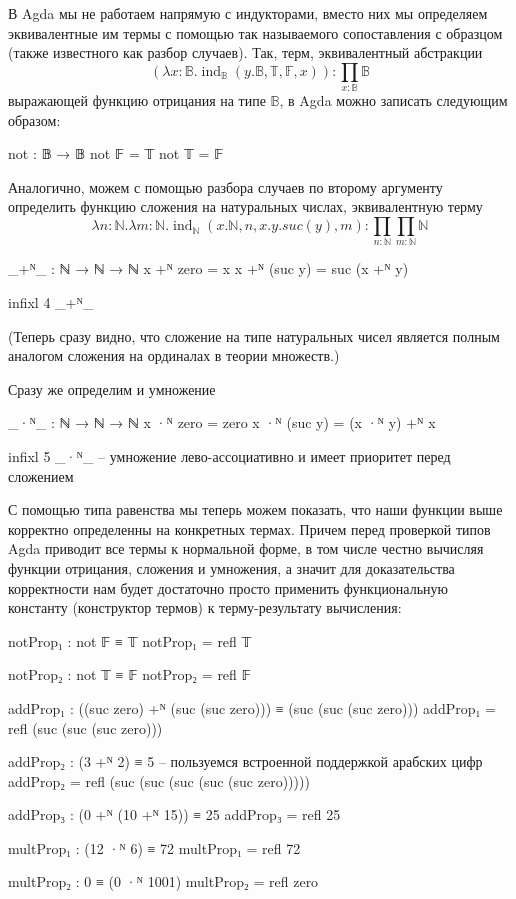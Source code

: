 \documentclass{article}[12pt]
\newcommand{\ind}{\operatorname{ind}}
\begin{document}
В Agda мы не работаем напрямую с индукторами, вместо них мы определяем эквивалентные им
термы с помощью так называемого сопоставления с образцом (также известного как разбор случаев). 
Так, терм, эквивалентный абстракции
$$(\lambda x : \mathbb B . \ind_{\mathbb B}(y.\mathbb B, \mathbb T, \mathbb F, x)) : \prod \limits_{x : \mathbb B} \mathbb B$$
выражающей функцию отрицания на типе $\mathbb B$, в Agda можно записать следующим образом:
\begin{code}
not : 𝔹 → 𝔹
not 𝔽 = 𝕋
not 𝕋 = 𝔽
\end{code}
Аналогично, можем с помощью разбора случаев по второму аргументу определить функцию сложения на натуральных числах, эквивалентную
терму
$$\lambda n : \mathbb N . \lambda m : \mathbb N . \ind_{\mathbb N}(x.\mathbb N, n, x.y.suc(y), m) : \prod_{n : \mathbb N} \prod_{m : \mathbb N} \mathbb N$$
\begin{code}
_+ᴺ_ : ℕ → ℕ → ℕ
x +ᴺ zero = x
x +ᴺ (suc y) = suc (x +ᴺ y)

infixl 4 _+ᴺ_
\end{code}
(Теперь сразу видно, что сложение на типе натуральных чисел является полным аналогом сложения
на ординалах в теории множеств.)

Сразу же определим и умножение
\begin{code}
_·ᴺ_ : ℕ → ℕ → ℕ
x ·ᴺ zero = zero
x ·ᴺ (suc y) = (x ·ᴺ y) +ᴺ x

infixl 5 _·ᴺ_ -- умножение лево-ассоциативно и имеет приоритет перед сложением
\end{code}

С помощью типа равенства  мы теперь можем показать, что наши функции выше
корректно определенны на конкретных термах. Причем перед проверкой типов Agda приводит все термы к нормальной
форме, в том числе честно вычисляя функции отрицания, сложения и умножения, а значит
для доказательства корректности нам будет достаточно просто применить функциональную константу
(конструктор термов)  к терму-результату вычисления:
\begin{code}
notProp₁ : not 𝔽 ≡ 𝕋
notProp₁ = refl 𝕋

notProp₂ : not 𝕋 ≡ 𝔽
notProp₂ = refl 𝔽

addProp₁ : ((suc zero) +ᴺ (suc (suc zero))) ≡ (suc (suc (suc zero)))
addProp₁ = refl (suc (suc (suc zero)))

addProp₂ : (3 +ᴺ 2) ≡ 5 -- пользуемся встроенной поддержкой арабских цифр
addProp₂ = refl (suc (suc (suc (suc (suc zero)))))

addProp₃ : (0 +ᴺ (10 +ᴺ 15)) ≡ 25
addProp₃ = refl 25

multProp₁ : (12 ·ᴺ 6) ≡ 72
multProp₁ = refl 72

multProp₂ : 0 ≡ (0 ·ᴺ 1001)
multProp₂ = refl zero
\end{code}
\end{document}
